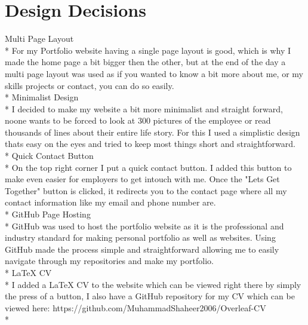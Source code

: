 \documentclass{turabian}
\begin{document}
\section{\large Design Decisions}
{\large Multi Page Layout }\\*
For my Portfolio website having a single page layout is good, which is why I made the home page a bit bigger then the other, but at the end of the day a multi page layout was used as if you wanted to know a bit more about me, or my skills projects or contact, you can do so easily.\\*
{\large Minimalist Design }\\*
I decided to make my website a bit more minimalist and straight forward, noone wants to be forced to look at 300 pictures of the employee or read thousands of lines about their entire life story. For this I used a simplistic design thats easy on the eyes and tried to keep most things short and straightforward.\\*
{\large Quick Contact Button }\\*
On the top right corner I put a quick contact button. I added this button to make even easier for employers to get intouch with me. Once the "Lets Get Together" button is clicked, it redirects you to the contact page where all my contact information like my email and phone number are.\\*
{\large GitHub Page Hosting }\\*
GitHub was used to host the portfolio website as it is the professional and industry standard for making personal portfolio as well as websites. Using GitHub made the process simple and straightforward allowing me to easily navigate through my repositories and make my portfolio.\\*
{\large LaTeX CV }\\*
I added a LaTeX CV to the website which can be viewed right there by simply the press of a button, I also have a GitHub repository for my CV which can be viewed here: https://github.com/MuhammadShaheer2006/Overleaf-CV\\*
\end{document}
